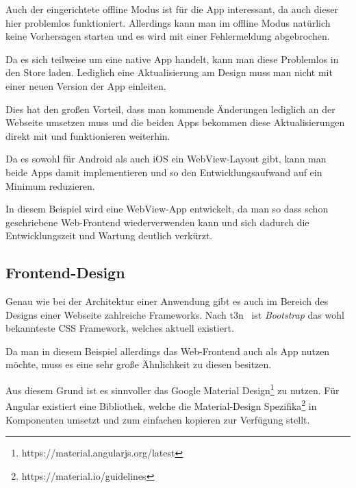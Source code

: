 Auch der eingerichtete offline Modus ist für die App interessant, da auch dieser hier problemlos funktioniert.
Allerdings kann man im offline Modus natürlich keine Vorhersagen starten und es wird mit einer Fehlermeldung
abgebrochen.

Da es sich teilweise um eine native App handelt, kann man diese Problemlos in den Store laden. Lediglich eine
Aktualisierung am Design muss man nicht mit einer neuen Version der App einleiten.

Dies hat den großen Vorteil, dass man kommende Änderungen lediglich an der Webseite umsetzen muss und die beiden Apps
bekommen diese Aktualisierungen direkt mit und funktionieren weiterhin.

Da es sowohl für Android als auch iOS ein WebView-Layout gibt, kann man beide Apps damit implementieren und so den
Entwicklungsaufwand auf ein Minimum reduzieren.

In diesem Beispiel wird eine WebView-App entwickelt, da man so dass schon geschriebene Web-Frontend wiederverwenden
kann und sich dadurch die Entwicklungszeit und Wartung deutlich verkürzt.

\subsection{Frontend-Design}
Genau wie bei der Architektur einer Anwendung gibt es auch im Bereich des Designs einer Webseite zahlreiche Frameworks.
Nach t3n~\cite{online_analyse_css} ist \textit{Bootstrap} das wohl bekannteste CSS Framework, welches aktuell existiert.

Da man in diesem Beispiel allerdings das Web-Frontend auch als App nutzen möchte, muss es eine sehr große Ähnlichkeit zu
diesen besitzen.

Aus diesem Grund ist es sinnvoller das Google Material Design\footnote{https://material.angularjs.org/latest} zu nutzen.
Für Angular existiert eine Bibliothek, welche die Material-Design Spezifika\footnote{https://material.io/guidelines} in
Komponenten umsetzt und zum einfachen kopieren zur Verfügung stellt.